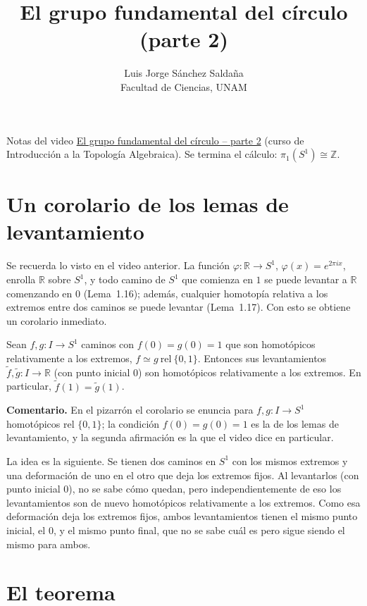 \documentclass[11pt]{article}
\title{El grupo fundamental del círculo (parte 2)}
\author{Luis Jorge Sánchez Saldaña\\[2pt]\small Facultad de Ciencias, UNAM}
\date{}
\begin{document}
\maketitle

\noindent\small Notas del video
\href{https://www.youtube.com/watch?v=-dMbSPakLgw}{\guillemotleft{}El grupo fundamental del círculo -- parte 2\guillemotright{}}
(curso de Introducción a la Topología Algebraica). Se termina el cálculo: $\pi_1(S^1)\cong\mathbb{Z}$.
\normalsize

\section*{Un corolario de los lemas de levantamiento}

Se recuerda lo visto en el video anterior. La función $\varphi\colon\mathbb{R}\to S^1$, $\varphi(x)=e^{2\pi i x}$, enrolla $\mathbb{R}$ sobre $S^1$, y todo camino de $S^1$ que comienza en $1$ se puede levantar a $\mathbb{R}$ comenzando en $0$ (Lema~1.16); además, cualquier homotopía relativa a los extremos entre dos caminos se puede levantar (Lema~1.17). Con esto se obtiene un corolario inmediato.

\begin{cor}
Sean $f,g\colon I\to S^1$ caminos con $f(0)=g(0)=1$ que son homotópicos relativamente a los extremos, $f\simeq g\ \mathrm{rel}\ \{0,1\}$. Entonces sus levantamientos $\tilde f,\tilde g\colon I\to\mathbb{R}$ (con punto inicial $0$) son homotópicos relativamente a los extremos. En particular, $\tilde f(1)=\tilde g(1)$.
\end{cor}

\noindent\textbf{Comentario.} En el pizarrón el corolario se enuncia para $f,g\colon I\to S^1$ homotópicos rel $\{0,1\}$; la condición $f(0)=g(0)=1$ es la de los lemas de levantamiento, y la segunda afirmación es la que el video dice \guillemotleft{}en particular\guillemotright{}.

\medskip
La idea es la siguiente. Se tienen dos caminos en $S^1$ con los mismos extremos y una deformación de uno en el otro que deja los extremos fijos. Al levantarlos (con punto inicial $0$), no se sabe cómo quedan, pero independientemente de eso los levantamientos son de nuevo homotópicos relativamente a los extremos. Como esa deformación deja los extremos fijos, ambos levantamientos tienen el mismo punto inicial, el $0$, y el mismo punto final, que no se sabe cuál es pero sigue siendo el mismo para ambos.

\section*{El teorema}
\end{document}
